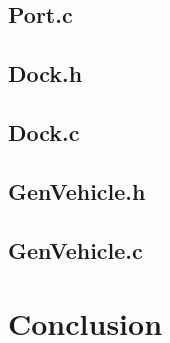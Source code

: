 \documentclass[a4paper, 11pt]{article}
\begin{document}
	\subsection{Port.c}
		
	\subsection{Dock.h}
		
	\subsection{Dock.c}
		
	\subsection{GenVehicle.h}
		
	\subsection{GenVehicle.c}
		

\section{Conclusion}
\end{document}
